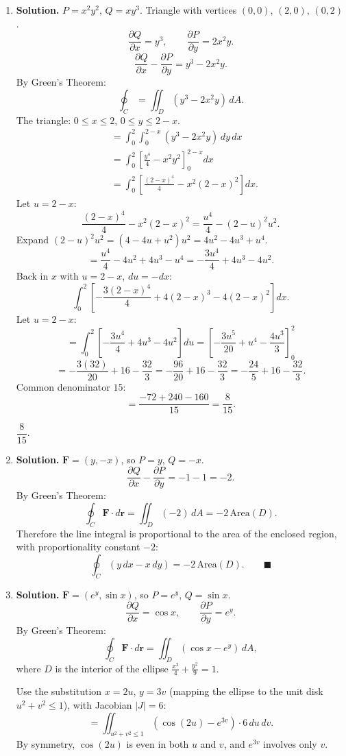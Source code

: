 \begin{enumerate}
\item \textbf{Solution.}
$P = x^2y^2$, $Q = xy^3$. Triangle with vertices $(0,0)$, $(2,0)$, $(0,2)$.
\[
\frac{\partial Q}{\partial x} = y^3, \qquad \frac{\partial P}{\partial y} = 2x^2y.
\]
\[
\frac{\partial Q}{\partial x}-\frac{\partial P}{\partial y} = y^3 - 2x^2y.
\]
By Green's Theorem:
\[
\oint_C = \iint_D (y^3 - 2x^2y)\,dA.
\]
The triangle: $0\le x \le 2$, $0\le y\le 2-x$.
\begin{align*}
&= \int_0^2\int_0^{2-x}(y^3-2x^2y)\,dy\,dx \\
&= \int_0^2\left[\frac{y^4}{4}-x^2y^2\right]_0^{2-x}dx \\
&= \int_0^2\left[\frac{(2-x)^4}{4}-x^2(2-x)^2\right]dx.
\end{align*}
Let $u = 2-x$:
\[
\frac{(2-x)^4}{4} - x^2(2-x)^2 = \frac{u^4}{4}-(2-u)^2 u^2.
\]
Expand $(2-u)^2 u^2 = (4-4u+u^2)u^2 = 4u^2 - 4u^3 + u^4$.
\[
= \frac{u^4}{4}-4u^2+4u^3-u^4 = -\frac{3u^4}{4}+4u^3-4u^2.
\]
Back in $x$ with $u=2-x$, $du=-dx$:
\[
\int_0^2\left[-\frac{3(2-x)^4}{4}+4(2-x)^3-4(2-x)^2\right]dx.
\]
Let $u=2-x$:
\[
= \int_0^2\left[-\frac{3u^4}{4}+4u^3-4u^2\right]du = \left[-\frac{3u^5}{20}+u^4-\frac{4u^3}{3}\right]_0^2
\]
\[
= -\frac{3(32)}{20}+16-\frac{32}{3} = -\frac{96}{20}+16-\frac{32}{3} = -\frac{24}{5}+16-\frac{32}{3}.
\]
Common denominator $15$:
\[
= \frac{-72+240-160}{15} = \frac{8}{15}.
\]

$\boxed{\dfrac{8}{15}}$.

\item \textbf{Solution.}
$\mathbf{F}=(y,-x)$, so $P=y$, $Q=-x$.
\[
\frac{\partial Q}{\partial x}-\frac{\partial P}{\partial y} = -1 - 1 = -2.
\]
By Green's Theorem:
\[
\oint_C \mathbf{F}\cdot d\mathbf{r} = \iint_D(-2)\,dA = -2\,\text{Area}(D).
\]
Therefore the line integral is proportional to the area of the enclosed region, with proportionality constant $-2$:
\[
\oint_C (y\,dx - x\,dy) = -2\,\text{Area}(D). \qquad\blacksquare
\]

\item \textbf{Solution.}
$\mathbf{F}=(e^y, \sin x)$, so $P=e^y$, $Q=\sin x$.
\[
\frac{\partial Q}{\partial x} = \cos x, \qquad \frac{\partial P}{\partial y} = e^y.
\]
By Green's Theorem:
\[
\oint_C \mathbf{F}\cdot d\mathbf{r} = \iint_D(\cos x - e^y)\,dA,
\]
where $D$ is the interior of the ellipse $\frac{x^2}{4}+\frac{y^2}{9}=1$.

Use the substitution $x = 2u$, $y = 3v$ (mapping the ellipse to the unit disk $u^2+v^2\le 1$), with Jacobian $|J|=6$:
\[
= \iint_{u^2+v^2\le 1}(\cos(2u)-e^{3v})\cdot 6\,du\,dv.
\]
By symmetry, $\cos(2u)$ is even in both $u$ and $v$, and $e^{3v}$ involves only $v$.


\end{enumerate}
